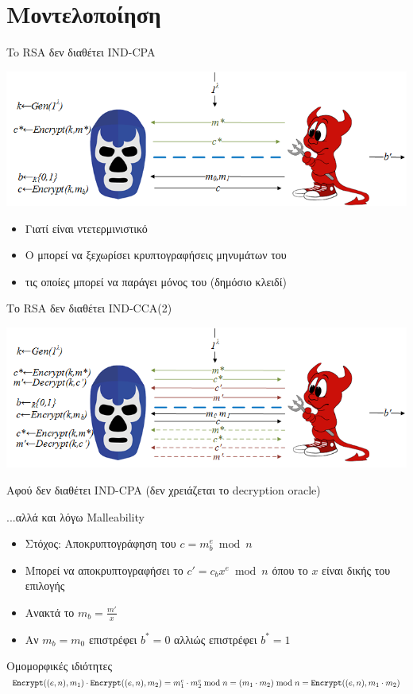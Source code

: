 \documentclass[handout]{beamer}
\begin{document}
\section{Μοντελοποίηση}
\begin{frame}{To RSA δεν διαθέτει IND-CPA}
\begin{center}
\includegraphics[scale=0.6]{ind-cpa.png}  
\end{center}

\begin{itemize}
\item Γιατί είναι ντετερμινιστικό
\item Ο \adv μπορεί να ξεχωρίσει κρυπτογραφήσεις μηνυμάτων του
\item τις οποίες μπορεί να παράγει μόνος του (δημόσιο κλειδί)
\end{itemize} 
\end{frame}

\begin{frame}[allowframebreaks]{Το RSA δεν διαθέτει IND-CCA(2)}
\begin{center}
\includegraphics[scale=0.6]{ind-cca.png}  
\end{center}
Αφού δεν διαθέτει IND-CPA (δεν χρειάζεται το decryption oracle)

\framebreak
...αλλά και λόγω \alert{Malleability}
 
\begin{itemize}
\item Στόχος: Αποκρυπτογράφηση του $c = m_b^e \bmod{n}$
\item Μπορεί να αποκρυπτογραφήσει το $ c'= c_b x^e \bmod{n}$ όπου το $x$ είναι δικής του επιλογής
\item Ανακτά το $m_b = \frac{m'}{x}$ 
\item Αν $m_b = m_0$ επιστρέφει $b^*=0$ αλλιώς επιστρέφει $b^*=1$
\end{itemize}
 
\begin{block}{Ομομορφικές ιδιότητες}
$\mathtt{Encrypt}((e,n),m_1) \cdot \mathtt{Encrypt}((e,n),m_2) = m_1^e \cdot m_2^e \bmod{n} = (m_1 \cdot m_2) \bmod{n} = \mathtt{Encrypt}((e,n),m_1 \cdot m_2)$
\end{block}

\end{frame}
\end{document}

